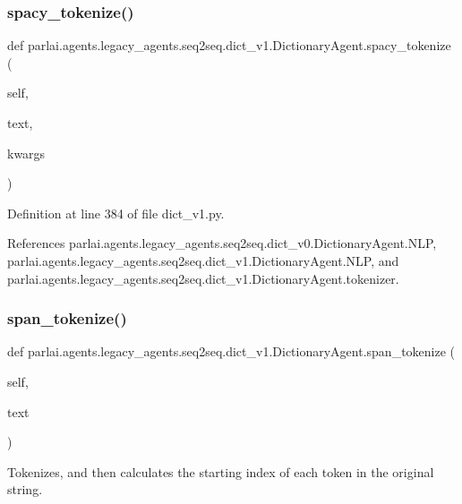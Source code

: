 \subsubsection{\texorpdfstring{spacy\+\_\+tokenize()}{spacy\_tokenize()}}
{\footnotesize\ttfamily def parlai.\+agents.\+legacy\+\_\+agents.\+seq2seq.\+dict\+\_\+v1.\+Dictionary\+Agent.\+spacy\+\_\+tokenize (\begin{DoxyParamCaption}\item[{}]{self,  }\item[{}]{text,  }\item[{}]{kwargs }\end{DoxyParamCaption})}



Definition at line 384 of file dict\+\_\+v1.\+py.



References parlai.\+agents.\+legacy\+\_\+agents.\+seq2seq.\+dict\+\_\+v0.\+Dictionary\+Agent.\+N\+LP, parlai.\+agents.\+legacy\+\_\+agents.\+seq2seq.\+dict\+\_\+v1.\+Dictionary\+Agent.\+N\+LP, and parlai.\+agents.\+legacy\+\_\+agents.\+seq2seq.\+dict\+\_\+v1.\+Dictionary\+Agent.\+tokenizer.

\mbox{\label{classparlai_1_1agents_1_1legacy__agents_1_1seq2seq_1_1dict__v1_1_1DictionaryAgent_a0927c0c01fe0abd28964a992e42c0548}} 
\subsubsection{\texorpdfstring{span\+\_\+tokenize()}{span\_tokenize()}}
{\footnotesize\ttfamily def parlai.\+agents.\+legacy\+\_\+agents.\+seq2seq.\+dict\+\_\+v1.\+Dictionary\+Agent.\+span\+\_\+tokenize (\begin{DoxyParamCaption}\item[{}]{self,  }\item[{}]{text }\end{DoxyParamCaption})}

\begin{DoxyVerb}Tokenizes, and then calculates the starting index of each token in
the original string.
\end{DoxyVerb}
 

